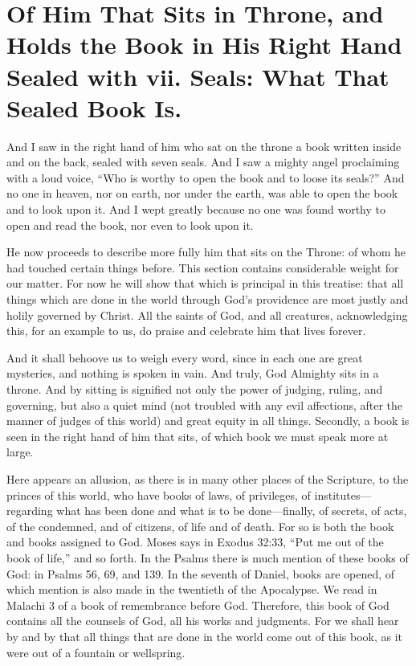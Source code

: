 \chapter[Sermon 26. Of Him That Sits in Throne, and Holds the Book in His Right Hand Sealed with vii. Seals: What That Sealed Book Is.]{Of Him That Sits in Throne, and Holds the Book in His Right Hand Sealed with vii. Seals: What That Sealed Book Is.}
\label{sermon:026}

And I saw in the right hand of him who sat on the throne a book written inside and on the back, sealed with seven seals. And I saw a mighty angel proclaiming with a loud voice, “Who is worthy to open the book and to loose its seals?” And no one in heaven, nor on earth, nor under the earth, was able to open the book and to look upon it. And I wept greatly because no one was found worthy to open and read the book, nor even to look upon it.

He now proceeds to describe more fully him that sits on the Throne: of whom he had touched certain things before. This section contains considerable weight for our matter. For now he will show that which is principal in this treatise: that all things which are done in the world through God’s providence are most justly and holily governed by Christ. All the saints of God, and all creatures, acknowledging this, for an example to us, do praise and celebrate him that lives forever.

And it shall behoove us to weigh every word, since in each one are great mysteries, and nothing is spoken in vain. And truly, God Almighty sits in a throne. And by sitting is signified not only the power of judging, ruling, and governing, but also a quiet mind (not troubled with any evil affections, after the manner of judges of this world) and great equity in all things. Secondly, a book is seen in the right hand of him that sits, of which book we must speak more at large.

Here appears an allusion, as there is in many other places of the Scripture, to the princes of this world, who have books of laws, of privileges, of institutes—regarding what has been done and what is to be done—finally, of secrets, of acts, of the condemned, and of citizens, of life and of death. For so is both the book and books assigned to God. Moses says in Exodus 32:33, “Put me out of the book of life,” and so forth. In the Psalms there is much mention of these books of God: in Psalms 56, 69, and 139. In the seventh of Daniel, books are opened, of which mention is also made in the twentieth of the Apocalypse. We read in Malachi 3 of a book of remembrance before God. Therefore, this book of God contains all the counsels of God, all his works and judgments. For we shall hear by and by that all things that are done in the world come out of this book, as it were out of a fountain or wellspring.

